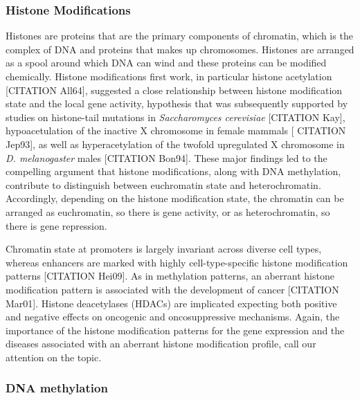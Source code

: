 \subsubsection{Histone Modifications}

Histones are proteins that are the primary components of chromatin, which is the complex of DNA and proteins that makes up chromosomes. Histones are arranged as a spool around which DNA can wind and these proteins can be modified chemically. Histone modifications first work, in particular histone acetylation [CITATION All64], suggested a close relationship between histone modification state and the local gene activity, hypothesis that was subsequently supported by studies on histone-tail mutations in \textit{Saccharomyces cerevisiae} [CITATION Kay], hypoacetulation of the inactive X chromosome in female mammals [ CITATION Jep93], as well as hyperacetylation of the twofold upregulated X chromosome in \textit{D. melanogaster} males [CITATION Bon94]. These major findings led to the compelling argument that histone modifications, along with DNA methylation, contribute to distinguish between euchromatin state and heterochromatin. Accordingly, depending on the histone modification state, the chromatin can be arranged as euchromatin, so there is gene activity, or as heterochromatin, so there is gene repression.

\medskip

Chromatin state at promoters is largely invariant across diverse cell types, whereas enhancers are marked with highly cell-type-specific histone modification patterns [CITATION Hei09]. As in methylation patterns, an aberrant histone modification pattern is associated with the development of cancer [CITATION Mar01]. Histone deacetylases (HDACs) are implicated expecting both positive and negative effects on oncogenic and oncosuppressive mechanisms. Again, the importance of the histone modification patterns for the gene expression and the diseases associated with an aberrant histone modification profile, call our attention on the topic.

\subsubsection{DNA methylation}

